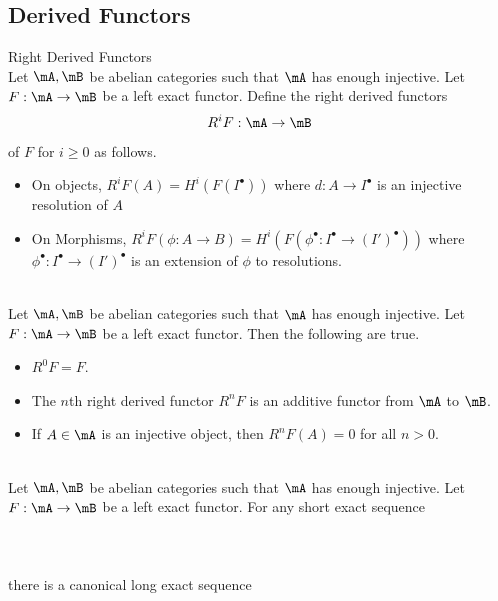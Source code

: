 \documentclass[a4paper]{article}
\begin{document}
\subsection{Derived Functors}
\begin{defn}{Right Derived Functors}{}\\
Let $\mA,\mB$ be abelian categories such that $\mA$ has enough injective. Let $F:\mA\to\mB$ be a left exact functor. Define the right derived functors $$R^iF:\mA\to\mB$$ of $F$ for $i\geq 0$ as follows. 
\begin{itemize}
\item On objects, $R^iF(A)=H^i(F(I^\bullet))$ where $d:A\to I^\bullet$ is an injective resolution of $A$
\item On Morphisms, $R^iF(\phi:A\to B)=H^i(F(\phi^\bullet:I^\bullet\to (I')^\bullet))$ where $\phi^\bullet:I^\bullet\to(I')^\bullet$ is an extension of $\phi$ to resolutions. 
\end{itemize}
\end{defn}

\begin{prp}{}{}\\
Let $\mA,\mB$ be abelian categories such that $\mA$ has enough injective. Let $F:\mA\to\mB$ be a left exact functor. Then the following are true. 
\begin{itemize}
\item $R^0F=F$. 
\item The $n$th right derived functor $R^nF$ is an additive functor from $\mA$ to $\mB$. 
\item If $A\in\mA$ is an injective object, then $R^nF(A)=0$ for all $n>0$. 
\end{itemize}
\end{prp}

\begin{prp}{}{}\\
Let $\mA,\mB$ be abelian categories such that $\mA$ has enough injective. Let $F:\mA\to\mB$ be a left exact functor. For any short exact sequence \\~\\
\\~\\
there is a canonical long exact sequence \\~\\
\\~\\
\end{prp}
\end{document}
